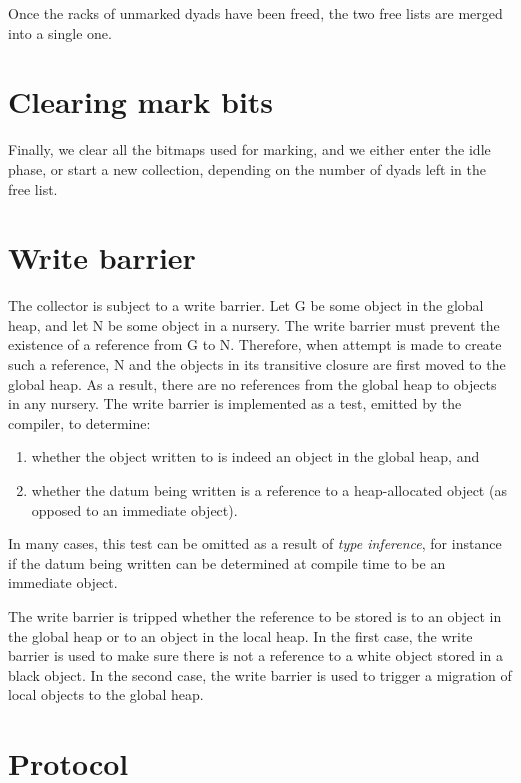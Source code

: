 Once the racks of unmarked dyads have been freed, the two free lists
are merged into a single one.

\section{Clearing mark bits}

Finally, we clear all the bitmaps used for marking, and we either
enter the idle phase, or start a new collection, depending on the
number of dyads left in the free list.

\section{Write barrier}

The collector is subject to a write barrier.  Let G be some
object in the global heap, and let N be some object in a nursery.  The
write barrier must prevent the existence of a reference from G to N.
Therefore, when attempt is made to create such a reference, N and the
objects in its transitive closure are first moved to the global heap.
As a result, there are no references from the global heap to objects
in any nursery.  The write barrier is implemented as a test, emitted
by the compiler, to determine:

\begin{enumerate}
\item whether the object written to is indeed an object in the global
  heap, and
\item whether the datum being written is a reference to a
  heap-allocated object (as opposed to an immediate object).
\end{enumerate}

In many cases, this test can be omitted as a result of \emph{type
  inference}, for instance if the datum being written can be
determined at compile time to be an immediate object.

The write barrier is tripped whether the reference to be stored is to
an object in the global heap or to an object in the local heap.  In
the first case, the write barrier is used to make sure there is not a
reference to a white object stored in a black object.  In the second
case, the write barrier is used to trigger a migration of local
objects to the global heap.

\section{Protocol}

